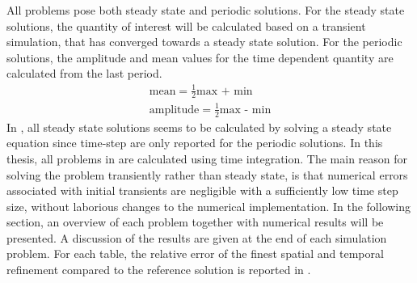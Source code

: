 \newpage
All problems pose both steady state and periodic solutions. For the steady state solutions, the quantity of interest will be calculated based on a transient simulation, that has converged towards a steady state solution. For the periodic solutions, the amplitude and mean values for the time dependent quantity are calculated from the last period.
\begin{align}
\text{mean} = \frac{1}{2} \text{max + min} \\
\text{amplitude} = \frac{1}{2} \text{max - min}
\label{icond}
\end{align}
 In \cite{Hron2006}, all steady state solutions seems to be calculated by solving a steady state equation since time-step are only reported for the periodic solutions. In this thesis, all problems in \cite{Hron2006} are calculated using time integration. The main reason for solving the problem transiently rather than steady state, is that numerical errors associated with initial transients are negligible with a sufficiently low time step size, without laborious changes to the numerical implementation. In the following section, an overview of each problem together with numerical results will be presented. A discussion of the results are given at the end of each simulation problem. For each table, the relative error of the finest spatial and temporal refinement compared to the reference solution is reported in \cite{Hron2006}.
 \newpage
